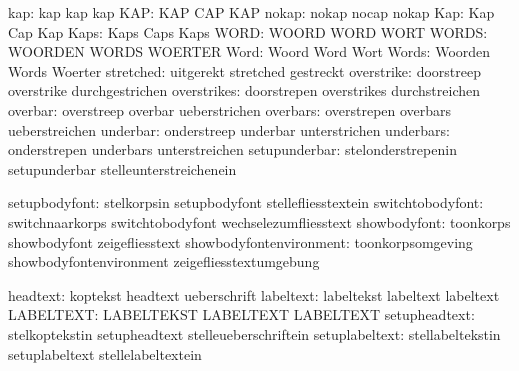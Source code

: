                           kap:  kap                          kap
                                kap
                          KAP:  KAP                          CAP
                                KAP
                        nokap:  nokap                        nocap
                                nokap
                          Kap:  Kap                          Cap
                                Kap
                         Kaps:  Kaps                         Caps
                                Kaps
                         WORD:  WOORD                        WORD
                                WORT
                        WORDS:  WOORDEN                      WORDS
                                WOERTER
                         Word:  Woord                        Word
                                Wort
                        Words:  Woorden                      Words
                                Woerter
                    stretched:  uitgerekt                    stretched
                                gestreckt
                   overstrike:  doorstreep                   overstrike
                                durchgestrichen
                  overstrikes:  doorstrepen                  overstrikes
                                durchstreichen
                      overbar:  overstreep                   overbar
                                ueberstrichen
                     overbars:  overstrepen                  overbars
                                ueberstreichen
                     underbar:  onderstreep                  underbar
                                unterstrichen
                    underbars:  onderstrepen                 underbars
                                unterstreichen
                setupunderbar:  stelonderstrepenin           setupunderbar
                                stelleunterstreichenein

                setupbodyfont:  stelkorpsin                  setupbodyfont
                                stellefliesstextein
             switchtobodyfont:  switchnaarkorps              switchtobodyfont
                                wechselezumfliesstext
                 showbodyfont:  toonkorps                    showbodyfont
                                zeigefliesstext
      showbodyfontenvironment:  toonkorpsomgeving            showbodyfontenvironment
                                zeigefliesstextumgebung

                     headtext:  koptekst                     headtext
                                ueberschrift
                    labeltext:  labeltekst                   labeltext
                                labeltext
                    LABELTEXT:  LABELTEKST                   LABELTEXT
                                LABELTEXT
                setupheadtext:  stelkoptekstin               setupheadtext
                                stelleueberschriftein
               setuplabeltext:  stellabeltekstin             setuplabeltext
                                stellelabeltextein

